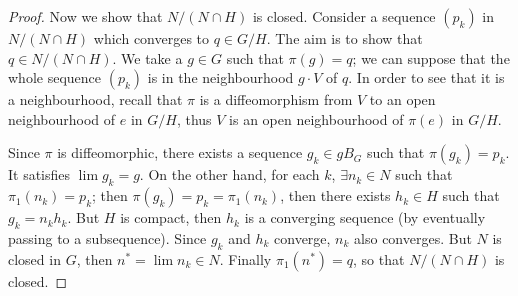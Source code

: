 \begin{proof}
	Now we show that $N/(N\cap H)$ is closed. Consider a sequence $(p_k)$ in $N/(N\cap H)$ which converges to $q\in G/H$. The aim is to show that $q\in N/(N\cap H)$. We take a $g\in G$ such that $\pi(g)=q$; we can suppose that the whole sequence $(p_k)$ is in the neighbourhood $g\cdot V$ of $q$. In order to see that it is a neighbourhood, recall that $\pi$ is a diffeomorphism from $V$ to an open neighbourhood of $e$ in $G/H$, thus $V$ is an open neighbourhood of $\pi(e)$ in $G/H$.

	Since $\pi$ is diffeomorphic, there exists a sequence $g_k\in gB_G$ such that $\pi(g_k)=p_k$. It satisfies $\lim g_k=g$. On the other hand, for each $k$, $\exists n_k\in N$ such that $\pi_1(n_k)=p_k$; then $\pi(g_k)=p_k=\pi_1(n_k)$, then there exists $h_k\in H$ such that $g_k=n_kh_k$. But $H$ is compact, then $h_k$ is a converging sequence (by eventually passing to a subsequence). Since $g_k$ and $h_k$ converge, $n_k$ also converges. But $N$ is closed in $G$, then $n^*=\lim n_k\in N$. Finally $\pi_1(n^*)=q$, so that $N/(N\cap H)$ is closed.
\end{proof}
